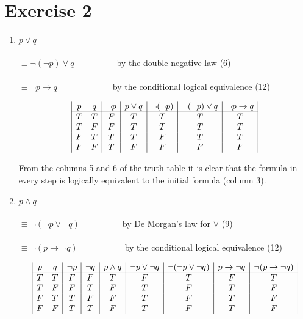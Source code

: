 \documentclass[a4paper,11pt]{article}
\begin{document}
\section*{Exercise 2}
\begin{enumerate}
    \item %
        $p \vee q$\\\\
        $\equiv \neg (\neg p) \vee q$~~~~~~~~~~by the double negative law (6)\\\\
        $\equiv \neg p \rightarrow q$~~~~~~~~~~~~~by the conditional logical equivalence (12)

        \begin{displaymath}
        \begin{array}{|c c|c|c|c|c|c|}
        p & q & \neg p & p \vee q & \neg (\neg p) & \neg (\neg p) \vee q & \neg p \rightarrow q\\
        \hline %
        T & T & F & T & T & T & T\\
        T & F & F & T & T & T & T\\
        F & T & T & T & F & T & T\\
        F & F & T & F & F & F & F\\
        \end{array}
        \end{displaymath}

        From the columns 5 and 6 of the truth table it is clear that the formula in every step is logically equivalent to the initial formula (column 3).\\
    \item %
        $p \wedge q$\\\\
        $\equiv \neg (\neg p \vee \neg q)$~~~~~~~~~~by De Morgan's law for $\vee$ (9)\\\\
        $\equiv \neg (p \rightarrow \neg q)$~~~~~~~~~~~by the conditional logical equivalence (12)

        \begin{displaymath}
        \begin{array}{|c c|c|c|c|c|c|c|c|}
        p & q & \neg p & \neg q & p \wedge q & \neg p \vee \neg q & \neg (\neg p \vee \neg q) & p \rightarrow \neg q & \neg (p \rightarrow \neg q)\\
        \hline %
        T & T & F & F & T & F & T & F & T\\
        T & F & F & T & F & T & F & T & F\\
        F & T & T & F & F & T & F & T & F\\
        F & F & T & T & F & T & F & T & F\\
        \end{array}
        \end{displaymath}


\end{enumerate}
\end{document}
